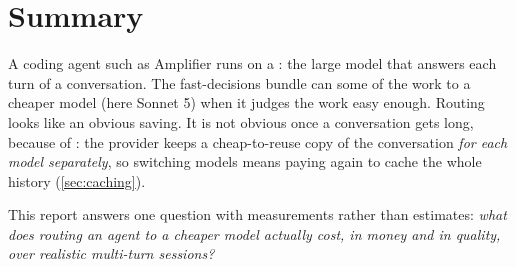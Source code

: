 \section{Summary}\label{sec:summary}

A coding agent such as Amplifier runs on a : the large model that answers each turn of a
conversation. The fast-decisions bundle can  some of the work to a cheaper model (here Sonnet 5)
when it judges the work easy enough. Routing looks like an obvious saving. It is not obvious once a
conversation gets long, because of : the provider keeps a cheap-to-reuse copy of the
conversation \emph{for each model separately}, so switching models means paying again to cache the whole
history (\cref{sec:caching}).

This report answers one question with measurements rather than estimates: \emph{what does routing an agent
to a cheaper model actually cost, in money and in quality, over realistic multi-turn sessions?}

